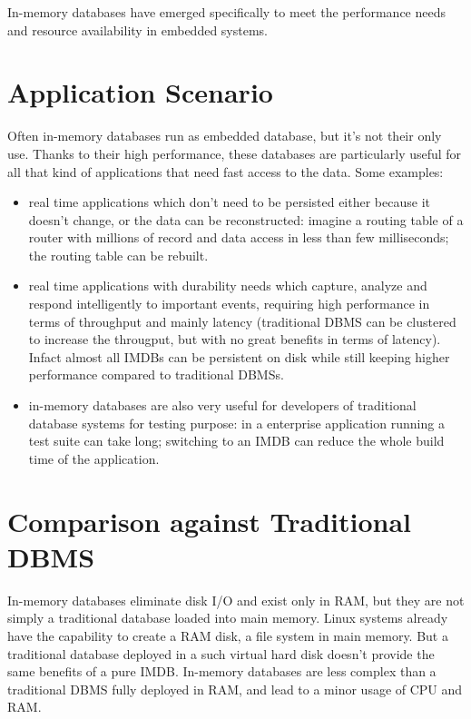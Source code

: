 		In-memory databases have emerged specifically to meet the performance needs 
		and resource availability in embedded systems.
		
	\section{Application Scenario}
		Often in-memory databases run as embedded database, but it's not their only use.
		Thanks to their high performance, these databases are particularly useful
		for all that kind of applications that need fast access to the data. Some examples:
		
		\begin{itemize}
			\item real time applications which don't need to be persisted either because it doesn't change, 
			or the data can be reconstructed: imagine a routing table of a router with millions of 
			record and data access in less than few milliseconds; the routing table can 
			be rebuilt\cite{Fowler}.
			\item real time applications with durability needs which capture, analyze and respond
			intelligently to important events, requiring high performance in terms of throughput and mainly 
			latency (traditional DBMS can be clustered to increase the througput, but with no great 
			benefits in terms of latency). Infact almost all IMDBs can 
			be persistent on disk while still keeping higher performance compared to 
			traditional DBMSs.
			\item in-memory databases are also very useful for developers of traditional database 
			systems for testing purpose: in a enterprise application running a test suite can take 
			long; switching to an IMDB can reduce the whole build time of the application.		
		\end{itemize}
		
	\section{Comparison against Traditional DBMS}
		In-memory databases eliminate disk I/O and exist only in RAM, but they are not simply a 
		traditional database loaded into main memory. Linux systems already have the
		capability to create a RAM disk, a file system in main memory. But a traditional 
		database deployed in a such virtual hard disk doesn't provide the same benefits of a 
		pure IMDB. In-memory databases are less complex than a traditional DBMS fully deployed 
		in RAM, and lead to a minor usage of CPU and RAM.
		
